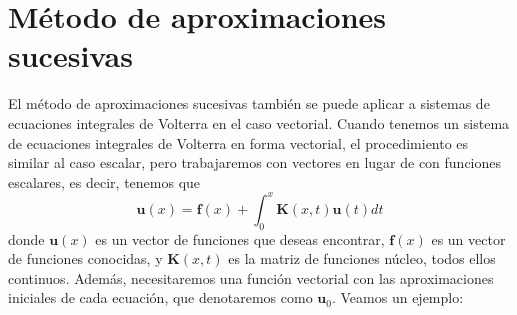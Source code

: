 \section{Método de aproximaciones sucesivas}
El método de aproximaciones sucesivas también se puede aplicar a sistemas de ecuaciones integrales de Volterra en el caso vectorial. Cuando tenemos un sistema de ecuaciones integrales de Volterra en forma vectorial, el procedimiento es similar al caso escalar, pero trabajaremos con vectores en lugar de con funciones escalares, es decir, tenemos que
\begin{equation}
	\textbf{u}(x) = \textbf{f}(x) + \int_0^x \textbf{K}(x,t)\textbf{u}(t)dt
\end{equation}
donde $\textbf{u}(x)$ es un vector de funciones que deseas encontrar, $\textbf{f}(x)$ es un vector de funciones conocidas, y $\textbf{K}(x,t)$ es la matriz de funciones núcleo, todos ellos continuos. Además, necesitaremos una función vectorial con las aproximaciones iniciales de cada ecuación, que denotaremos como $\textbf{u}_0$. Veamos un ejemplo:
